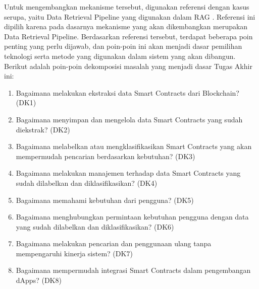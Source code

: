 Untuk mengembangkan mekanisme tersebut, digunakan referensi dengan kasus serupa, yaitu Data Retrieval Pipeline yang digunakan dalam RAG \parencite{CrateDB_RAG_Pipelines}. Referensi ini dipilih karena pada dasarnya mekanisme yang akan dikembangkan merupakan Data Retrieval Pipeline. Berdasarkan referensi tersebut, terdapat beberapa poin penting yang perlu dijawab, dan poin-poin ini akan menjadi dasar pemilihan teknologi serta metode yang digunakan dalam sistem yang akan dibangun. Berikut adalah poin-poin dekomposisi masalah yang menjadi dasar Tugas Akhir ini:

\begin{enumerate}
  \item Bagaimana melakukan ekstraksi data Smart Contracts dari Blockchain? (DK1)
  \item Bagaimana menyimpan dan mengelola data Smart Contracts yang sudah diekstrak? (DK2)
  \item Bagaimana melabelkan atau mengklasifikasikan Smart Contracts yang akan mempermudah pencarian berdasarkan kebutuhan? (DK3)
  \item Bagaimana melakukan manajemen terhadap data Smart Contracts yang sudah dilabelkan dan diklasifikasikan? (DK4)
  \item Bagaimana memahami kebutuhan dari pengguna? (DK5)
  \item Bagaimana menghubungkan permintaan kebutuhan pengguna dengan data yang sudah dilabelkan dan diklasifikasikan? (DK6)
  \item Bagaimana melakukan pencarian dan penggunaan ulang tanpa mempengaruhi kinerja sistem? (DK7)
  \item Bagaimana mempermudah integrasi Smart Contracts dalam pengembangan dApps? (DK8)
\end{enumerate}


